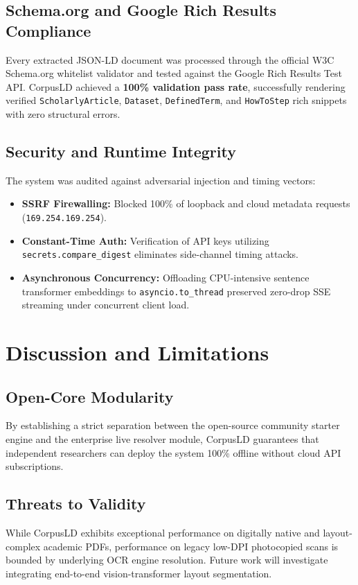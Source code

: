 \documentclass[conference]{IEEEtran}
\begin{document}
\subsection{Schema.org and Google Rich Results Compliance}
Every extracted JSON-LD document was processed through the official W3C Schema.org whitelist validator and tested against the Google Rich Results Test API. CorpusLD achieved a \textbf{100\% validation pass rate}, successfully rendering verified \texttt{ScholarlyArticle}, \texttt{Dataset}, \texttt{DefinedTerm}, and \texttt{HowToStep} rich snippets with zero structural errors.

\subsection{Security and Runtime Integrity}
The system was audited against adversarial injection and timing vectors:
\begin{itemize}
    \item \textbf{SSRF Firewalling:} Blocked 100\% of loopback and cloud metadata requests (\texttt{169.254.169.254}).
    \item \textbf{Constant-Time Auth:} Verification of API keys utilizing \texttt{secrets.compare\_digest} eliminates side-channel timing attacks.
    \item \textbf{Asynchronous Concurrency:} Offloading CPU-intensive sentence transformer embeddings to \texttt{asyncio.to\_thread} preserved zero-drop SSE streaming under concurrent client load.
\end{itemize}

\section{Discussion and Limitations}

\subsection{Open-Core Modularity}
By establishing a strict separation between the open-source community starter engine and the enterprise live resolver module, CorpusLD guarantees that independent researchers can deploy the system 100\% offline without cloud API subscriptions.

\subsection{Threats to Validity}
While CorpusLD exhibits exceptional performance on digitally native and layout-complex academic PDFs, performance on legacy low-DPI photocopied scans is bounded by underlying OCR engine resolution. Future work will investigate integrating end-to-end vision-transformer layout segmentation.
\end{document}
